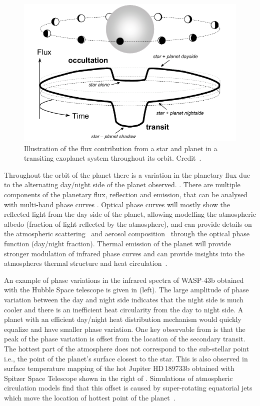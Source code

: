 \begin{figure}
    \centering
    \includegraphics[width=0.6\linewidth]{./figures/introduction/circular_diagram.png}
    \caption{Illustration of the flux contribution from a star and planet in a transiting exoplanet system throughout its orbit. Credit~\citet{winn_transits_2010}.}
    \label{fig:transits_and_occultations}
\end{figure}

Throughout the orbit of the planet there is a variation in the planetary flux due to the alternating day/night side of the planet observed. .
There are multiple components of the planetary flux, reflection and emission, that can be analysed with multi-band phase curves \citep[e.g.][]{knutson_characterizing_2009, esteves_optical_2013}. Optical phase curves will mostly show the reflected light from the day side of the planet, allowing modelling the atmospheric albedo (fraction of light reflected by the atmosphere), and can provide details on the atmospheric scattering~\citep{madhusudhan_analytic_2012} and aerosol composition~\citep{oreshenko_optical_2016} through the optical phase function (day/night fraction). Thermal emission of the planet will provide stronger modulation of infrared phase curves and can provide insights into the atmospheres thermal
structure and heat circulation~\citep{ goodman_thermodynamics_2009, koll_temperature_2016}.

An example of phase variations in the infrared spectra of {WASP-43b} obtained with the Hubble Space telescope is given in  (left). The large amplitude of phase variation between the day and night side indicates that the night side is much cooler and there is an inefficient heat circularity from the day to night side. A planet with an efficient day/night heat distribution mechanism would quickly equalize and have smaller phase variation. One key observable from  is that the peak of the phase variation is offset from the location of the secondary transit. The hottest part of the atmosphere does not correspond to the sub-stellar point i.e., the point of the planet's surface closest to the star. This is also observed in surface temperature mapping of the hot Jupiter HD\,189733b obtained with {Spitzer Space Telescope} \citep{knutson_map_2007} shown in the right of . Simulations of atmospheric circulation models find that this offset is caused by super-rotating equatorial jets which move the location of hottest point of the planet~\citep[e.g.][and references therein]{heng_atmospheric_2015}. 

